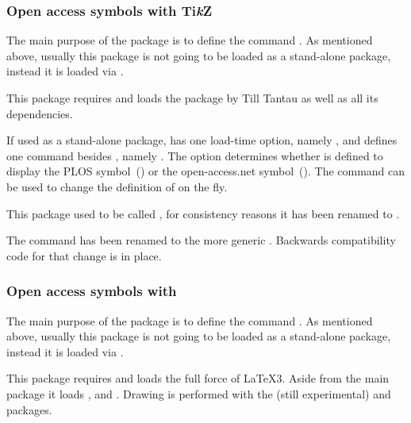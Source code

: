 \documentclass[DIV=9]{scrartcl}
\begin{document}
\subsubsection[Ti\emph{k}Z]{Open access symbols with Ti\emph{k}Z}
\label{sec:oa:symbol-tikz}
\label{exltd@itm@biblatex-ext-oasymb-tikz}
The main purpose of the package 
is to define the command .
As mentioned above, usually this package is not going to be loaded as a
stand-alone package, instead it is loaded via
.

This package requires and loads the package
 by Till Tantau as well as all
its dependencies.

If used as a stand-alone package,  has one
load-time option, namely , and defines one command besides
, namely .
The option determines whether  is defined to display
the PLOS symbol~()
or the open-access.net symbol~().
The command  can be used to change the definition
of  on the fly.

This package used to be called ,
for consistency reasons it has been renamed to .

The command  has been renamed to the more generic
.
Backwards compatibility code for that change is in place.


\subsubsection[\sty{l3draw}]{Open access symbols with }
\label{sec:oa:symbol-l3draw}
\label{exltd@itm@biblatex-ext-oasymb-l3draw}
The main purpose of the package 
is to define the command .
As mentioned above, usually this package is not going to be loaded as a
stand-alone package, instead it is loaded via
.

This package requires and loads the full force of \LaTeX3.
Aside from the main package  it
loads ,
and .
Drawing is performed with the (still experimental)
 and
 packages.
\end{document}
